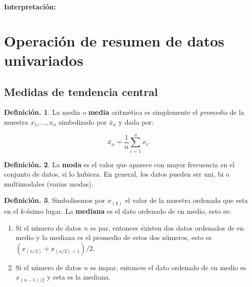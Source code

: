 \documentclass[]{book}
\theoremstyle{definition}
\newtheorem{definition}{Definición.}[chapter]
\theoremstyle{definition}
\theoremstyle{definition}
\theoremstyle{remark}
\begin{document}
\textbf{Interpretación:}

\hypertarget{operaciuxf3n-de-resumen-de-datos-univariados}{%
\section{Operación de resumen de datos univariados}\label{operaciuxf3n-de-resumen-de-datos-univariados}}

\hypertarget{medidas-de-tendencia-central}{%
\subsection{Medidas de tendencia central}\label{medidas-de-tendencia-central}}

\begin{definition}
\protect\hypertarget{def:unnamed-chunk-83}{}{\label{def:unnamed-chunk-83} }La media o \textbf{media} aritmética es simplemente el
\emph{promedio} de la muestra
\(x_1, \ldots , x_n\) simbolizado por \(\bar{x}_n\) y dada
por:

\[\bar{x}_n = \frac{1}{n} \sum_{i=1}^n x_i . \]
\end{definition}

\begin{definition}
\protect\hypertarget{def:unnamed-chunk-84}{}{\label{def:unnamed-chunk-84} }
La \textbf{moda} es el valor que aparece con mayor frecuencia
en el conjunto de
datos, si lo hubiera. En general, los datos pueden ser
uni, bi o multimodales (varias modas).
\end{definition}

\begin{definition}
\protect\hypertarget{def:unnamed-chunk-85}{}{\label{def:unnamed-chunk-85} }
Simbolisemos por \(x_{(k)}\) el valor de la muestra
ordenada que esta en el \(k\)-ésimo lugar. La
\textbf{mediana} es el dato ordenado de en medio, esto es:

\begin{enumerate}
\def\labelenumi{(\alph{enumi})}
\item
  Si el número de datos \(n\) es par, entonces existen
  dos datos ordenados de en medio y la
  mediana es el promedio de estos dos números, esto es
  \((x_{(n/2)} + x_{(n/2)+1})/2\).
\item
  Si el número de datos \(n\) es impar, entonces el dato
  ordenado de en medio es \(x_{(n-1)/2}\) y
  esta es la mediana.
\end{enumerate}
\end{definition}
\end{document}
